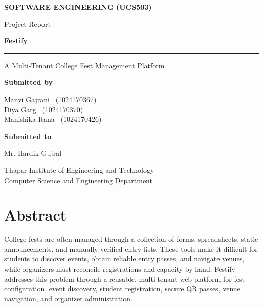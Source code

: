\documentclass[11pt,a4paper]{report}
\begin{document}
\begin{titlepage}
  \centering
  \vspace*{1.5cm}
  {\small\bfseries\color{subtle} SOFTWARE ENGINEERING (UCS503)\par}
  \vspace{0.4em}
  {\small\color{subtle} Project Report\par}
  \vspace{1.7cm}
  {\fontsize{46}{52}\selectfont\bfseries\color{festblue} Festify\par}
  \vspace{0.5em}
  {\color{festgold}\rule{5cm}{1.5pt}\par}
  \vspace{0.8em}
  {\Large\color{subtle} A Multi-Tenant College Fest Management Platform\par}
  \vspace{2.7cm}
  {\large\bfseries\color{festblue} Submitted by\par}
  \vspace{0.6em}
  {\large
    Manvi Gajrani \ (1024170367)\\[0.35em]
    Diya Garg \ (1024170370)\\[0.35em]
    Manishika Rana \ (1024170426)\par}
  \vspace{1.4cm}
  {\large\bfseries\color{festblue} Submitted to\par}
  \vspace{0.35em}
  {\large Mr. Hardik Gujral\par}
  \vfill
  {\large Thapar Institute of Engineering and Technology\\
  Computer Science and Engineering Department\par}
  \vspace*{1cm}
\end{titlepage}

\chapter*{Abstract}
College fests are often managed through a collection of forms, spreadsheets, static
announcements, and manually verified entry lists. These tools make it difficult for
students to discover events, obtain reliable entry passes, and navigate venues, while
organizers must reconcile registrations and capacity by hand. Festify addresses this
problem through a reusable, multi-tenant web platform for fest configuration, event
discovery, student registration, secure QR passes, venue navigation, and organizer
administration.
\end{document}
